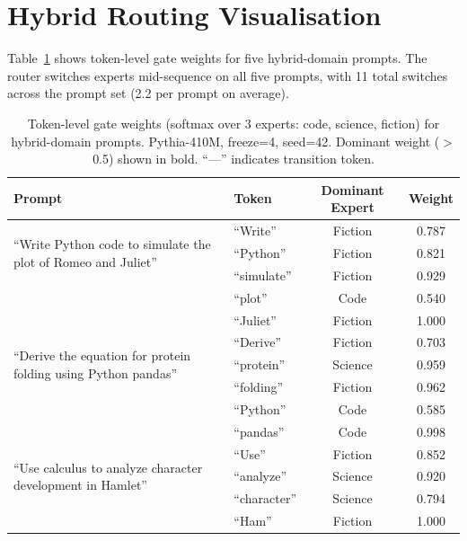 \documentclass{article}
\begin{document}
\section{Hybrid Routing Visualisation}
\label{app:routing}

Table~\ref{tab:routing} shows token-level gate weights for five hybrid-domain prompts. The router switches experts mid-sequence on all five prompts, with 11 total switches across the prompt set (2.2 per prompt on average).

\begin{table}[h]
\centering
\caption{Token-level gate weights (softmax over 3 experts: code, science, fiction) for hybrid-domain prompts. Pythia-410M, freeze=4, seed=42. Dominant weight ($>$0.5) shown in bold. ``---'' indicates transition token.}
\label{tab:routing}
\small
\begin{tabular}{p{3.5cm}lcc}
\toprule
\textbf{Prompt} & \textbf{Token} & \textbf{Dominant Expert} & \textbf{Weight} \\
\midrule
\multirow{3}{*}{\parbox{3.5cm}{``Write Python code to simulate the plot of Romeo and Juliet''}}
  & ``Write''    & Fiction & 0.787 \\
  & ``Python''   & Fiction & 0.821 \\
  & ``simulate'' & Fiction & 0.929 \\
  & ``plot''     & Code    & 0.540 \\
  & ``Juliet''   & Fiction & 1.000 \\
\midrule
\multirow{3}{*}{\parbox{3.5cm}{``Derive the equation for protein folding using Python pandas''}}
  & ``Derive''   & Fiction & 0.703 \\
  & ``protein''  & Science & 0.959 \\
  & ``folding''  & Fiction & 0.962 \\
  & ``Python''   & Code    & 0.585 \\
  & ``pandas''   & Code    & 0.998 \\
\midrule
\multirow{3}{*}{\parbox{3.5cm}{``Use calculus to analyze character development in Hamlet''}}
  & ``Use''      & Fiction & 0.852 \\
  & ``analyze''  & Science & 0.920 \\
  & ``character'' & Science & 0.794 \\
  & ``Ham''      & Fiction & 1.000 \\
\bottomrule
\end{tabular}
\end{table}
\end{document}
